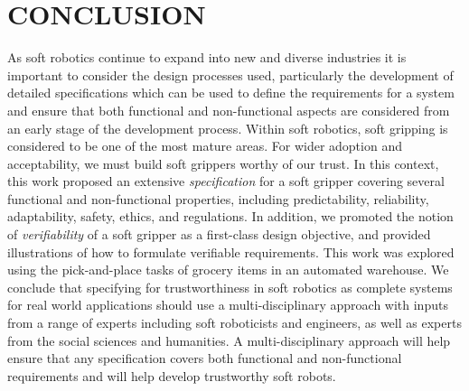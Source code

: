 \documentclass[letterpaper, 10 pt, conference]{ieeeconf}  %
\begin{document}
\section{CONCLUSION} \label{summary-conclusions}%
	As soft robotics continue to expand into new and diverse industries it is important to consider the design processes used, particularly the development of detailed specifications which can be used to define the requirements for a system and ensure that both functional and non-functional aspects are considered from an early stage of the development process.
	Within soft robotics, soft gripping is considered to be one of the most mature areas. 
	For wider adoption and acceptability, we must build soft grippers worthy of our trust. 
	In this context, this work proposed an extensive \emph{specification} for a soft gripper covering several functional and non-functional properties, including predictability, reliability, adaptability, safety, ethics, and regulations. 
	In addition, we promoted the notion of \emph{verifiability} of a soft gripper as a first-class design objective, and provided illustrations of how to formulate verifiable requirements.  
	This work was explored using the pick-and-place tasks of grocery items in an automated warehouse. 
 We conclude that specifying for trustworthiness in soft robotics as complete systems for real world applications should use a multi-disciplinary approach with inputs from a range of experts including soft roboticists and engineers, as well as experts from the social sciences and humanities.  A multi-disciplinary approach will help ensure that any specification covers both functional and non-functional requirements and will help develop trustworthy soft robots.
 
	
	\addtolength{\textheight}{-12cm}   %
	
\end{document}
